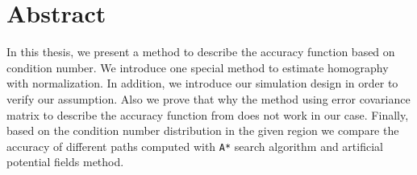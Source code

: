 \chapter{Abstract}
\label{chap:Abstract}

In this thesis, we present a method to describe the accuracy function based on condition number. We introduce one special method to estimate homography with normalization. In addition, we introduce our simulation design in order to verify our assumption. Also we prove that why the method using error covariance matrix to describe the accuracy function from \cite{bauer2007tracking} does not work in our case. Finally, based on the condition number distribution in the given region we compare the accuracy of different paths computed with \texttt{A*} search algorithm and artificial potential fields method.
